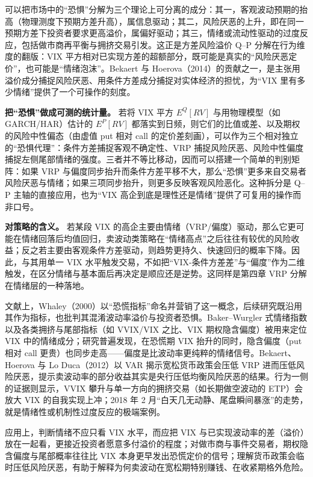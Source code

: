 \documentclass[11pt,a4paper]{ctexart}
\begin{document}
可以把市场中的“恐惧”分解为三个理论上可分离的成分：其一，客观波动预期的抬高（物理测度下预期方差升高），属信息驱动；其二，风险厌恶的上升，即在同一预期方差下投资者要求更高溢价，属偏好驱动；其三，情绪或流动性驱动的过度反应，包括做市商再平衡与拥挤交易引发。这正是方差风险溢价 Q–P 分解在行为维度的翻版：VIX 平方相对已实现方差的超额部分，既可能是真实的“风险厌恶定价”，也可能是“情绪泡沫”。Bekaert 与 Hoerova（2014）的贡献之一，是主张用溢价成分捕捉风险厌恶、用条件方差成分捕捉对实体经济的担忧，为“VIX 里有多少情绪”提供了一个可操作的刻度。

\textbf{把“恐惧”做成可测的统计量。} 若将 VIX 平方 $E^Q[RV]$ 与用物理模型（如 GARCH/HAR）估计的 $E^P[RV]$ 都落实到日频，则它们的比值或差、以及期权的风险中性偏态（由虚值 put 相对 call 的定价差刻画），可以作为三个相对独立的“恐惧代理”：条件方差捕捉客观不确定性、VRP 捕捉风险厌恶、风险中性偏度捕捉左侧尾部情绪的强度。三者并不等比移动，因而可以搭建一个简单的判别矩阵：如果 VRP 与偏度同步抬升而条件方差平移不大，那么“恐惧”更多来自交易者风险厌恶与情绪；如果三项同步抬升，则更多反映客观风险恶化。这种拆分是 Q–P 主轴的直接应用，也为“VIX 高企到底是理性还是情绪”提供了可复用的操作而非口号。

\textbf{对策略的含义。} 若某段 VIX 的高企主要由情绪（VRP/偏度）驱动，那么它更可能在情绪回落后均值回归，卖波动类策略在“情绪高点”之后往往有较优的风险收益；反之若主要由客观条件方差驱动，则趋势更持久、快速回归的概率下降。因此，与其用单一 VIX 水平触发交易，不如把“VIX-条件方差差”与“偏度”作为二维触发，在区分情绪与基本面后再决定是顺应还是逆势。这同样是第四章 VRP 分解在情绪层的一种落地。

文献上，Whaley（2000）以“恐慌指标”命名并营销了这一概念，后续研究既沿用其作为指标，也批判其混淆波动率溢价与投资者恐惧。Baker–Wurgler 式情绪指数以及各类拥挤与尾部指标（如 VVIX/VIX 之比、VIX 期权隐含偏度）被用来定位 VIX 中的情绪成分；研究普遍发现，在恐慌期 VIX 抬升的同时，隐含偏度（put 相对 call 更贵）也同步走高——偏度是比波动率更纯粹的情绪信号。Bekaert、Hoerova 与 Lo Duca（2012）以 VAR 揭示宽松货币政策会压低 VRP 进而压低风险厌恶，提示卖波动率的部分收益其实是央行压低均衡风险厌恶的结果。行为一侧的证据则显示，VVIX 攀升与单一方向的拥挤交易（如长期做空波动的 ETP）会放大 VIX 的自我实现上冲；2018 年 2 月“白天几无动静、尾盘瞬间暴涨”的走势，就是情绪性或机制性过度反应的极端案例。

应用上，判断情绪不应只看 VIX 水平，而应把 VIX 与已实现波动率的差（溢价）放在一起看，更接近投资者愿意多付溢价的程度；对做市商与事件交易者，期权隐含偏度与尾部概率往往比 VIX 本身更早发出恐慌定价的信号；理解货币政策会临时压低风险厌恶，有助于解释为何卖波动在宽松期特别赚钱、在收紧期格外危险。
\end{document}
